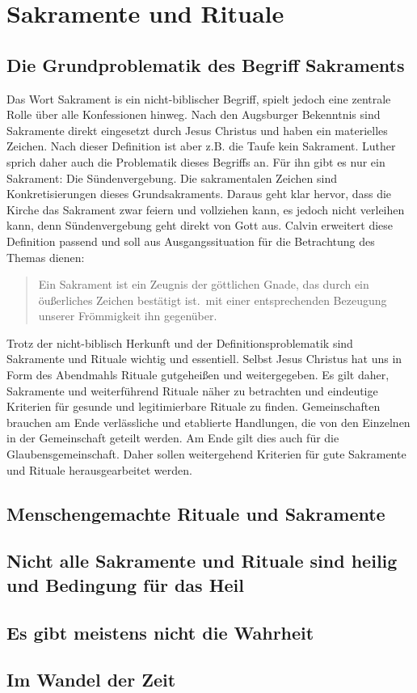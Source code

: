 \chapter{Sakramente und Rituale}\label{sec:Sakramente}

\section{Die Grundproblematik des Begriff Sakraments}
Das Wort Sakrament is ein nicht-biblischer Begriff, spielt jedoch eine zentrale Rolle über alle Konfessionen hinweg.
Nach den Augsburger Bekenntnis sind Sakramente direkt eingesetzt durch Jesus Christus und haben ein materielles Zeichen.
Nach dieser Definition ist aber z.B. die Taufe kein Sakrament. Luther sprich daher auch die Problematik dieses Begriffs an.
Für ihn gibt es nur ein Sakrament: Die Sündenvergebung. Die sakramentalen Zeichen sind Konkretisierungen dieses Grundsakraments.
Daraus geht klar hervor, dass die Kirche das Sakrament zwar feiern und vollziehen kann, es jedoch nicht verleihen kann, denn
Sündenvergebung geht direkt von Gott aus. Calvin erweitert diese Definition passend und soll aus Ausgangssituation für die Betrachtung
des Themas dienen:
\begin{verse}
    Ein Sakrament ist ein Zeugnis der göttlichen Gnade, das durch ein öußerliches Zeichen bestätigt ist.\ mit einer entsprechenden Bezeugung
    unserer Frömmigkeit ihn gegenüber.
\end{verse}
Trotz der nicht-biblisch Herkunft und der Definitionsproblematik sind Sakramente und Rituale wichtig und essentiell.
Selbst Jesus Christus hat uns in Form des Abendmahls Rituale gutgeheißen und weitergegeben. Es gilt daher, Sakramente und weiterführend
Rituale näher zu betrachten und eindeutige Kriterien für gesunde und legitimierbare Rituale zu finden. Gemeinschaften brauchen am Ende
verlässliche und etablierte Handlungen, die von den Einzelnen in der Gemeinschaft geteilt werden. Am Ende gilt dies auch für die Glaubensgemeinschaft.
Daher sollen weitergehend Kriterien für gute Sakramente und Rituale herausgearbeitet werden.

\section{Menschengemachte Rituale und Sakramente}
\section{Nicht alle Sakramente und Rituale sind heilig und Bedingung für das Heil}
\section{Es gibt meistens nicht die Wahrheit}
\section{Im Wandel der Zeit}
